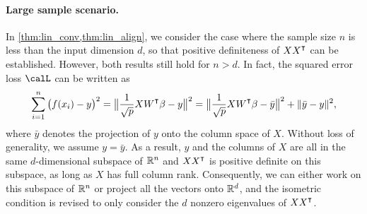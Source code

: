 \paragraph{Large sample scenario.} In \cref{thm:lin_conv,thm:lin_align}, we consider the case where the sample size $n$ is less than the input dimension $d$, so that positive definiteness of $XX\transpose$ can be established. However, both results still hold for $n>d$. In fact, the squared error loss $\calL$ can be written as
\begin{equation*}
\sum_{i=1}^n\big(f(x_i)-y\big)^2 = \big\|\frac{1}{\sqrt{p}}XW\transpose\beta-y\big\|^2 = \big\|\frac{1}{\sqrt{p}}XW\transpose\beta-\bar{y}\big\|^2+ \|\bar{y}-y\|^2,
\end{equation*}
where $\bar{y}$ denotes the projection of $y$ onto the column space of $X$. Without loss of generality, we assume $y=\bar{y}$. As a result, $y$ and the columns of $X$ are all in the same $d$-dimensional subspace of ${\mathbb{R}^n}$ and $XX\transpose$ is positive definite on this subspace, as long as $X$ has full column rank. Consequently, we can either work on this subspace of ${\mathbb{R}^n}$ or project all the vectors onto ${\mathbb{R}^{d}}$, and the isometric condition is revised to only consider the $d$ nonzero eigenvalues of $XX\transpose$.
